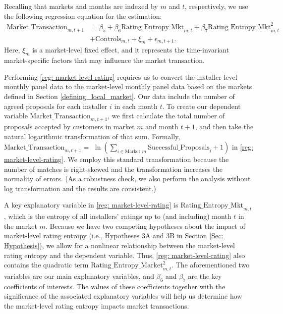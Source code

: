 \documentclass[msom,blindrev]{informs3}
\begin{document}
	
	
	Recalling that markets and months are indexed by $m$ and $t$, respectively, we use the following regression equation for the estimation:
	\begin{align} \nonumber
	\text{Market\_Transaction}_{m,t+1} & =\beta_{5} + \beta_{6} \text{Rating\_Entropy\_Mkt}_{m,t}+ \beta_{7} \text{Rating\_Entropy\_Mkt}_{m,t}^2\\ \label{reg: market-level-rating}
	&+ \text{Controls}_{m,t}  + \xi_{m} + \epsilon_{m,t+1}.
	\end{align}
	Here, $\xi_{m}$ is a market-level fixed effect, and it represents the time-invariant market-specific factors that may influence the market transaction.

	Performing \eqref{reg: market-level-rating} requires us to convert the installer-level monthly panel data to the market-level monthly panel data based on the markets defined in Section \ref{defining_local_market}. Our data include the number of agreed proposals for each installer $i$ in each month $t$. To create our dependent variable $\text{Market\_Transaction}_{m,t+1}$, we first calculate the total number of proposals accepted by customers in market $m$ and month $t+1$, and then take the natural logarithmic transformation of that sum. Formally, $\text{Market\_Transaction}_{m,t+1} =$ $\ln\left( \sum_{i \in \text{Market\ } m} \text{Successful\_Proposals}_{i}+ 1 \right)$ in \eqref{reg: market-level-rating}.  We employ this standard transformation because the number of matches is right-skewed and the transformation increases the normality of errors. (As a robustness check, we also perform the analysis without log transformation and the results are consistent.)
	
	A key explanatory variable in \eqref{reg: market-level-rating} is $\text{Rating\_Entropy\_Mkt}_{m,t}$, which is the entropy of all installers' ratings up to (and including) month $t$ in the market $m$.
	Because we have two competing hypotheses about the impact of market-level rating entropy (i.e., Hypotheses 3A and 3B in Section \ref{Sec: Hypothesis}), we allow for a  nonlinear relationship between the market-level rating entropy and the dependent variable. Thus, \eqref{reg: market-level-rating} also contains the quadratic term  $\text{Rating\_Entropy\_Market}_{m,t}^{2}$. The aforementioned two variables are our main explanatory variables, and $\beta_{6}$ and $\beta_{7}$ are the key coefficients of interests. The values of these coefficients together with the significance of the associated explanatory variables will help us determine how the market-level rating entropy impacts market transactions.
	
\end{document}
